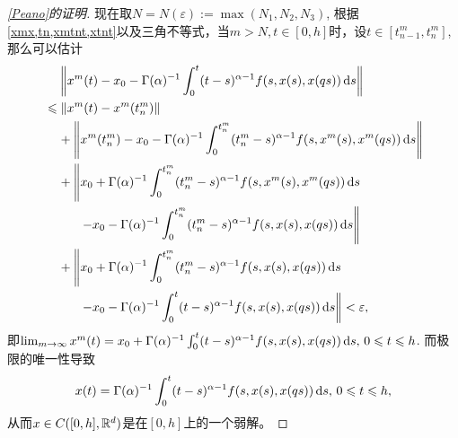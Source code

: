 \begin{proof}[\cref{Peano}的证明]
    现在取$N=N(\varepsilon):=\max (N_1,N_2,N_3)$, 根据\cref{xmx,tn,xmtnt,xtnt}以及三角不等式，当$m>N,t\in [0,h]$时，设$t\in \left[t^m_{n-1},t^m_n\right]$, 那么可以估计
    \begin{align*}
        &\relphantom{\leqslant}\left\|x^m(t)-x_0-\Gamma(\alpha)^{-1}\int_{0}^{t}(t-s)^{\alpha-1}f(s,x(s),x(qs))\differential s\right\|
        \\ &\leqslant \left\|x^m(t)-x^m(t^m_n)\right\|
        \\ &\relphantom{\leqslant}+\left\|x^m(t^m_n)-x_0-\Gamma(\alpha)^{-1}\int_{0}^{t^m_n}(t^m_n-s)^{\alpha-1}f(s,x^m(s),x^m(qs))\differential s\right\|
        \\ &\relphantom{\leqslant}+\left\|x_0+\Gamma(\alpha)^{-1}\int_{0}^{t^m_n}(t^m_n-s)^{\alpha-1}f(s,x^m(s),x^m(qs))\differential s\right.
        \\ &\relphantom{\leqslant+} \phantom{\left\|\right.} \left.-x_0-\Gamma(\alpha)^{-1}\int_{0}^{t^m_n}(t^m_n-s)^{\alpha-1}f(s,x(s),x(qs))\differential s\right\|
        \\ &\relphantom{\leqslant}+\left\|x_0+\Gamma(\alpha)^{-1}\int_{0}^{t^m_n}(t^m_n-s)^{\alpha-1}f(s,x(s),x(qs))\differential s\right.
        \\ &\relphantom{\leqslant+} \phantom{\left\|\right.} \left.-x_0-\Gamma(\alpha)^{-1}\int_{0}^{t}(t-s)^{\alpha-1}f(s,x(s),x(qs))\differential s\right\|
        <\varepsilon,
    \end{align*}
    即$\lim_{m\to \infty}x^m(t)=x_0+\Gamma(\alpha)^{-1}\int_{0}^{t}(t-s)^{\alpha-1}f(s,x(s),x(qs))\mathop{}\!\mathrm{d} s,\,\allowbreak 0\leqslant t\leqslant h$. 而极限的唯一性导致
    \begin{equation*}
        x(t)=\Gamma(\alpha)^{-1}\int_{0}^{t}(t-s)^{\alpha-1}f(s,x(s),x(qs))\mathop{}\!\mathrm{d} s,\,0\leqslant t\leqslant h,
    \end{equation*}
    从而$x\in C([0,h],\mathbb{R}^d)$是\mainEquation 在$[0,h]$上的一个弱解。
\end{proof}


